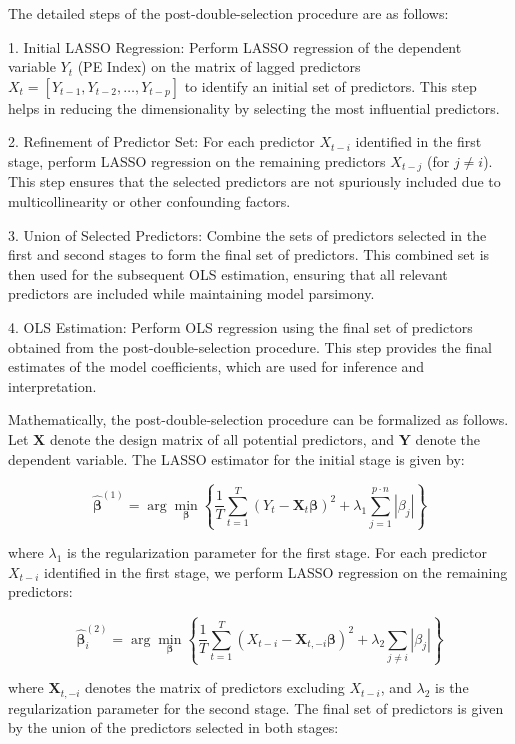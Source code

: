 \documentclass[12pt]{article}
\begin{document}
The detailed steps of the post-double-selection procedure are as follows:

1. Initial LASSO Regression: Perform LASSO regression of the dependent variable \(Y_t\) (PE Index) on the matrix of lagged predictors \(X_t = [Y_{t-1}, Y_{t-2}, \ldots, Y_{t-p}]\) to identify an initial set of predictors. This step helps in reducing the dimensionality by selecting the most influential predictors.

2. Refinement of Predictor Set: For each predictor \(X_{t-i}\) identified in the first stage, perform LASSO regression on the remaining predictors \(X_{t-j}\) (for \(j \neq i\)). This step ensures that the selected predictors are not spuriously included due to multicollinearity or other confounding factors.

3. Union of Selected Predictors: Combine the sets of predictors selected in the first and second stages to form the final set of predictors. This combined set is then used for the subsequent OLS estimation, ensuring that all relevant predictors are included while maintaining model parsimony.

4. OLS Estimation: Perform OLS regression using the final set of predictors obtained from the post-double-selection procedure. This step provides the final estimates of the model coefficients, which are used for inference and interpretation.

Mathematically, the post-double-selection procedure can be formalized as follows. Let \(\mathbf{X}\) denote the design matrix of all potential predictors, and \(\mathbf{Y}\) denote the dependent variable. The LASSO estimator for the initial stage is given by:

\[
\hat{\boldsymbol{\beta}}^{(1)} = \arg\min_{\boldsymbol{\beta}} \left\{ \frac{1}{T} \sum_{t=1}^T (Y_t - \mathbf{X}_t \boldsymbol{\beta})^2 + \lambda_1 \sum_{j=1}^{p \cdot n} |\beta_j| \right\}
\]

where \(\lambda_1\) is the regularization parameter for the first stage. For each predictor \(X_{t-i}\) identified in the first stage, we perform LASSO regression on the remaining predictors:

\[
\hat{\boldsymbol{\beta}}^{(2)}_i = \arg\min_{\boldsymbol{\beta}} \left\{ \frac{1}{T} \sum_{t=1}^T (X_{t-i} - \mathbf{X}_{t,-i} \boldsymbol{\beta})^2 + \lambda_2 \sum_{j \neq i} |\beta_j| \right\}
\]

where \(\mathbf{X}_{t,-i}\) denotes the matrix of predictors excluding \(X_{t-i}\), and \(\lambda_2\) is the regularization parameter for the second stage. The final set of predictors is given by the union of the predictors selected in both stages:
\end{document}
